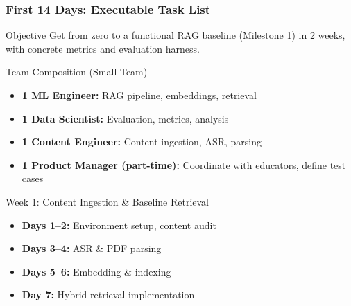 \documentclass[aspectratio=169]{beamer}
\begin{document}
\begin{frame}
\frametitle{First 14 Days: Executable Task List}
\begin{block}{Objective}
Get from zero to a functional RAG baseline (Milestone 1) in 2 weeks, with concrete metrics and evaluation harness.
\end{block}

\begin{block}{Team Composition (Small Team)}
\begin{itemize}
\item \textbf{1 ML Engineer:} RAG pipeline, embeddings, retrieval
\item \textbf{1 Data Scientist:} Evaluation, metrics, analysis
\item \textbf{1 Content Engineer:} Content ingestion, ASR, parsing
\item \textbf{1 Product Manager (part-time):} Coordinate with educators, define test cases
\end{itemize}
\end{block}

\begin{block}{Week 1: Content Ingestion \& Baseline Retrieval}
\begin{itemize}
\item \textbf{Days 1--2:} Environment setup, content audit
\item \textbf{Days 3--4:} ASR \& PDF parsing
\item \textbf{Days 5--6:} Embedding \& indexing
\item \textbf{Day 7:} Hybrid retrieval implementation
\end{itemize}
\end{block}
\end{frame}
\end{document}
